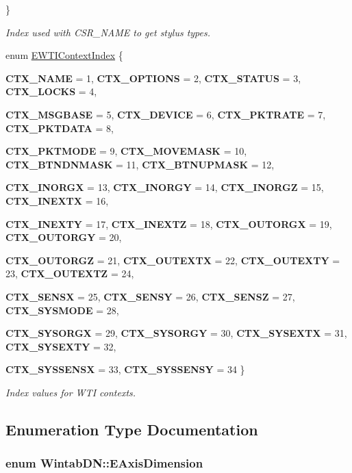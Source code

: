 \begin{DoxyCompactItemize}
 \}
\begin{DoxyCompactList}\small\item\em Index used with CSR\_\-NAME to get stylus types. \item\end{DoxyCompactList}\item 
enum \hyperlink{namespace_wintab_d_n_a75b4777047ea6ca407c8cd928ca9ef26}{EWTIContextIndex} \{ \par
{\bfseries CTX\_\-NAME} =  1, 
{\bfseries CTX\_\-OPTIONS} =  2, 
{\bfseries CTX\_\-STATUS} =  3, 
{\bfseries CTX\_\-LOCKS} =  4, 
\par
{\bfseries CTX\_\-MSGBASE} =  5, 
{\bfseries CTX\_\-DEVICE} =  6, 
{\bfseries CTX\_\-PKTRATE} =  7, 
{\bfseries CTX\_\-PKTDATA} =  8, 
\par
{\bfseries CTX\_\-PKTMODE} =  9, 
{\bfseries CTX\_\-MOVEMASK} =  10, 
{\bfseries CTX\_\-BTNDNMASK} =  11, 
{\bfseries CTX\_\-BTNUPMASK} =  12, 
\par
{\bfseries CTX\_\-INORGX} =  13, 
{\bfseries CTX\_\-INORGY} =  14, 
{\bfseries CTX\_\-INORGZ} =  15, 
{\bfseries CTX\_\-INEXTX} =  16, 
\par
{\bfseries CTX\_\-INEXTY} =  17, 
{\bfseries CTX\_\-INEXTZ} =  18, 
{\bfseries CTX\_\-OUTORGX} =  19, 
{\bfseries CTX\_\-OUTORGY} =  20, 
\par
{\bfseries CTX\_\-OUTORGZ} =  21, 
{\bfseries CTX\_\-OUTEXTX} =  22, 
{\bfseries CTX\_\-OUTEXTY} =  23, 
{\bfseries CTX\_\-OUTEXTZ} =  24, 
\par
{\bfseries CTX\_\-SENSX} =  25, 
{\bfseries CTX\_\-SENSY} =  26, 
{\bfseries CTX\_\-SENSZ} =  27, 
{\bfseries CTX\_\-SYSMODE} =  28, 
\par
{\bfseries CTX\_\-SYSORGX} =  29, 
{\bfseries CTX\_\-SYSORGY} =  30, 
{\bfseries CTX\_\-SYSEXTX} =  31, 
{\bfseries CTX\_\-SYSEXTY} =  32, 
\par
{\bfseries CTX\_\-SYSSENSX} =  33, 
{\bfseries CTX\_\-SYSSENSY} =  34
 \}
\begin{DoxyCompactList}\small\item\em Index values for WTI contexts. \item\end{DoxyCompactList}\end{DoxyCompactItemize}


\subsection{Enumeration Type Documentation}
\hypertarget{namespace_wintab_d_n_a38705aa38c49c04846399172fa9fd1cd}{
\subsubsection[{EAxisDimension}]{\setlength{\rightskip}{0pt plus 5cm}enum {\bf WintabDN::EAxisDimension}}}
\label{namespace_wintab_d_n_a38705aa38c49c04846399172fa9fd1cd}


